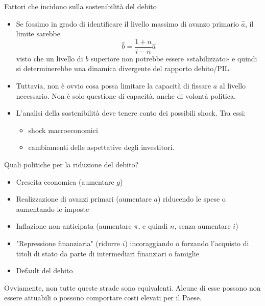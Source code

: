 \documentclass[aspectratio=64,11pt]{beamer}
\begin{document}
\begin{frame}{Fattori che incidono sulla sostenibilità del debito}

  \begin{itemize}
  \item Se fossimo in grado di identificare il livello massimo di avanzo
    primario \(\hat a\), il limite sarebbe
    \begin{equation*}
      \hat{b}=\frac{1+n}{i-n}\hat{a}
    \end{equation*}
    visto che un livello di \(b\) superiore non potrebbe essere «stabilizzato»
    e quindi si determinerebbe una dinamica divergente del rapporto
    debito/PIL.
  \item Tuttavia, non è ovvio cosa possa limitare la capacità di fissare \(a\)
    al livello necessario. Non è solo questione di capacità, anche di volontà
    politica.
  \item L'analisi della sostenibilità deve tenere conto dei possibili
    shock. Tra essi:
    \begin{itemize}
    \item shock macroeconomici
    \item cambiamenti delle aspettative degli investitori.
    \end{itemize}
  \end{itemize}
\end{frame}

\begin{frame}{Quali politiche per la riduzione del debito?}

  \begin{itemize}
  \item Crescita economica (aumentare $g$)
  \item Realizzazione di avanzi primari (aumentare $a$) riducendo le spese o
    aumentando le imposte
  \item Inflazione non anticipata (aumentare $\pi$, e quindi $n$, senza
    aumentare $i$)
  \item "Repressione finanziaria" (ridurre $i$) incoraggiando o forzando
    l'acquisto di titoli di stato da parte di intermediari finanziari o
    famiglie
  \item Default del debito
  \end{itemize}

  Ovviamente, non tutte queste strade sono equivalenti. Alcune di esse possono
  non essere attuabili o possono comportare costi elevati per il Paese.
\end{frame}
\end{document}
